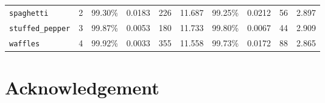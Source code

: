\documentclass[10pt]{article}
\makeatletter
\newcommand\backmatter{%
  \if@openright
    \cleardoublepage
  \else
    \clearpage
  \fi
   }
\makeatother
\begin{document}
\begin{table}[htb]
{{\begin{tabularx}{\linewidth}{ l | r | r r r r | r r r r }
							\texttt{spaghetti} & 2 & 99.30\% & 0.0183 & 226 & 11.687 & 99.25\% & 0.0212 & 56 & 2.897 \\
							\texttt{stuffed\_pepper} & 3 & 99.87\% & 0.0053 & 180 & 11.733 & 99.80\% & 0.0067 & 44 & 2.909 \\
							\texttt{waffles} & 4 & 99.92\% & 0.0033 & 355 & 11.558 & 99.73\% & 0.0172 & 88 & 2.865 \\
							\hline
						\end{tabularx}
					}
				}
				\label{tbl:table_binary_classification_overview}
			\end{table}
		
		
		
		
	\pagebreak
	\backmatter
	\section*{Acknowledgement}
		\thispagestyle{empty}
		
\end{document}
